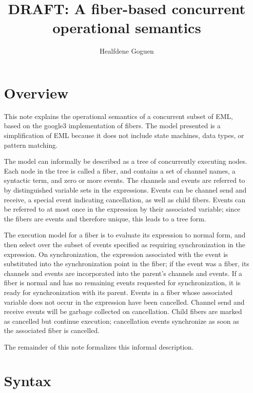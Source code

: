 \documentclass[acmsmall]{acmart}
\begin{document}
\title{DRAFT: A fiber-based concurrent operational semantics}
\author{Healfdene Goguen}
\maketitle

\section{Overview}

This note explains the operational semantics of a concurrent subset of EML, based on the google3 implementation of fibers. The model presented is a simplification of EML because it does not include state machines, data types, or pattern matching.

The model can informally be described as a tree of concurrently executing nodes. Each node in the tree is called a fiber, and contains a set of channel names, a syntactic term, and zero or more events. The channels and events are referred to by distinguished variable sets in the expressions. Events can be channel send and receive, a special event indicating cancellation, as well as child fibers. Events can be referred to at most once in the expression by their associated variable; since the fibers are events and therefore unique, this leads to a tree form.

The execution model for a fiber is to evaluate its expression to normal form, and then select over the subset of events specified as requiring synchronization in the expression. On synchronization, the expression associated with the event is substituted into the synchronization point in the fiber; if the event was a fiber, its channels and events are incorporated into the parent's channels and events. If a fiber is normal and has no remaining events requested for synchronization, it is ready for synchronization with its parent. Events in a fiber whose associated variable does not occur in the expression have been cancelled. Channel send and receive events will be garbage collected on cancellation. Child fibers are marked as cancelled but continue execution; cancellation events synchronize as soon as the associated fiber is cancelled.

The remainder of this note formalizes this informal description.

\section{Syntax}
\end{document}
